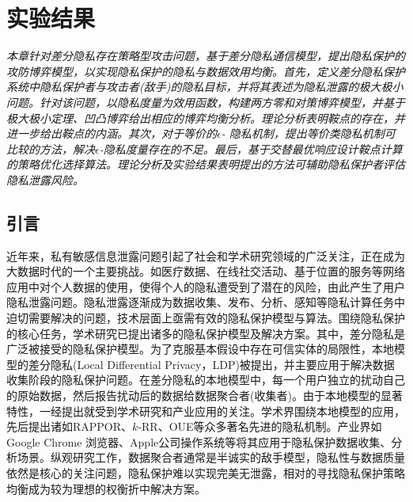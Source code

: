 \chapter{实验结果}\label{chapter08}
{\em 本章针对差分隐私存在策略型攻击问题，基于差分隐私通信模型，提出隐私保护的攻防博弈模型，以实现隐私保护的隐私与数据效用均衡。首先，定义差分隐私保护系统中隐私保护者与攻击者(敌手)的隐私目标，并将其表述为隐私泄露的极大极小问题。针对该问题，以隐私度量为效用函数，构建两方零和对策博弈模型，并基于极大极小定理、凹凸博弈给出相应的博弈均衡分析。理论分析表明鞍点的存在，并进一步给出鞍点的内涵。其次，对于等价的$\epsilon$- 隐私机制，提出等价类隐私机制可比较的方法，解决$\epsilon$-隐私度量存在的不足。最后，基于交替最优响应设计鞍点计算的策略优化选择算法。理论分析及实验结果表明提出的方法可辅助隐私保护者评估隐私泄露风险。}
\section{引言}
近年来，私有敏感信息泄露问题引起了社会和学术研究领域的广泛关注，正在成为大数据时代的一个主要挑战。如医疗数据、在线社交活动、基于位置的服务等网络应用中对个人数据的使用，使得个人的隐私遭受到了潜在的风险，由此产生了用户隐私泄露问题。隐私泄露逐渐成为数据收集、发布、分析、感知等隐私计算\cite{Lifenghua16}任务中迫切需要解决的问题，技术层面上亟需有效的隐私保护模型与算法。围绕隐私保护的核心任务，学术研究已提出诸多的隐私保护模型及解决方案。其中，差分隐私\cite{dwork2006differential,dwork2006calibrating,dwork2014algorithmic}是广泛被接受的隐私保护模型。为了克服基本假设中存在可信实体的局限性，本地模型的差分隐私\cite{duchi2013local,duchi2013Minimax}(Local Differential Privacy，LDP)被提出，并主要应用于解决数据收集阶段的隐私保护问题。在差分隐私的本地模型中，每一个用户独立的扰动自己的原始数据，然后报告扰动后的数据给数据聚合者(收集者)。由于本地模型的显著特性，一经提出就受到学术研究和产业应用的关注。学术界围绕本地模型的应用，先后提出诸如RAPPOR\cite{fanti2016building,erlingsson2014rappor}、$k$-RR\cite{kairouz2016extremal}、OUE\cite{wang2017locally}等众多著名先进的隐私机制。产业界如Google Chrome 浏览器\cite{erlingsson2014rappor}、Apple公司操作系统\cite{tang2017privacy}等将其应用于隐私保护数据收集、分析场景。纵观研究工作，数据聚合者通常是半诚实的敌手模型，隐私性与数据质量依然是核心的关注问题，隐私保护难以实现完美无泄露，相对的寻找隐私保护策略均衡成为较为理想的权衡折中解决方案。

